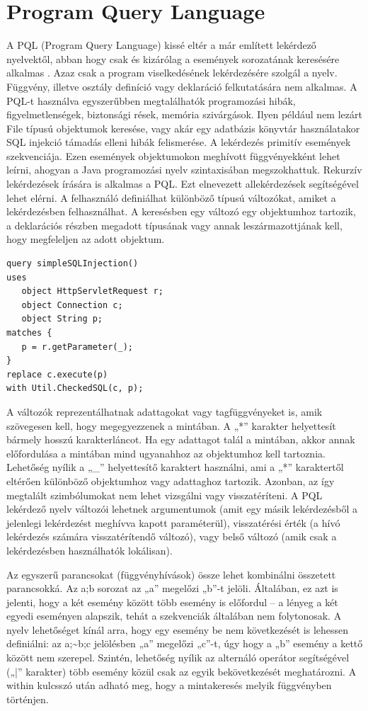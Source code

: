 \documentclass[a4paper,12pt]{report}
\begin{document}
\section{Program Query Language}
\par A PQL (Program Query Language) kissé eltér a már említett lekérdező nyelvektől, abban hogy csak és kizárólag a események sorozatának keresésére alkalmas \cite{pql}. Azaz csak a program viselkedésének lekérdezésére szolgál a nyelv. Függvény, illetve osztály definíció vagy deklaráció felkutatására nem alkalmas. A PQL-t használva egyszerűbben megtalálhatók programozási hibák, figyelmetlenségek, biztonsági rések, memória szivárgások. Ilyen például nem lezárt File típusú objektumok keresése, vagy akár egy adatbázis könyvtár használatakor SQL injekció támadás elleni hibák felismerése. A lekérdezés primitív események szekvenciája. Ezen események objektumokon meghívott függvényekként lehet leírni, ahogyan a Java programozási nyelv szintaxisában megszokhattuk. Rekurzív lekérdezések írására is alkalmas a PQL. Ezt elnevezett allekérdezések segítségével lehet elérni. A felhasználó definiálhat különböző típusú változókat, amiket a lekérdezésben felhasználhat. A keresésben egy változó egy objektumhoz tartozik, a deklarációs részben megadott típusának vagy annak leszármazottjának kell, hogy megfeleljen az adott objektum.
\begin{verbatim}
query simpleSQLInjection()
uses
   object HttpServletRequest r;
   object Connection c;
   object String p;
matches { 
   p = r.getParameter(_); 
}
replace c.execute(p)
with Util.CheckedSQL(c, p);
\end{verbatim} 
\par A változók reprezentálhatnak adattagokat vagy tagfüggvényeket is, amik szövegesen kell, hogy megegyezzenek a mintában. A „*” karakter helyettesít bármely hosszú karakterláncot. Ha egy adattagot talál a mintában, akkor annak előfordulása a mintában mind ugyanahhoz az objektumhoz kell tartoznia. Lehetőség nyílik a „\_” helyettesítő karaktert használni, ami a „*” karaktertől eltérően különböző objektumhoz vagy adattaghoz tartozik. Azonban, az így megtalált szimbólumokat nem lehet vizsgálni vagy visszatéríteni. A PQL lekérdező nyelv változói lehetnek argumentumok (amit egy másik lekérdezésből a jelenlegi lekérdezést meghívva kapott paraméterül), visszatérési érték (a hívó lekérdezés számára visszatérítendő változó), vagy belső változó (amik csak a lekérdezésben használhatók lokálisan).
\par Az egyszerű parancsokat (függvényhívások) össze lehet kombinálni összetett parancsokká. Az a;b sorozat az „a” megelőzi „b”-t jelöli. Általában, ez azt is jelenti, hogy a két esemény között több esemény is előfordul – a lényeg a két egyedi eseményen alapszik, tehát a szekvenciák általában nem folytonosak. A nyelv lehetőséget kínál arra, hogy egy esemény be nem következését is lehessen definiálni: az a;\textasciitilde b;c jelölésben „a” megelőzi „c”-t, úgy hogy a „b” esemény a kettő között nem szerepel. Szintén, lehetőség nyílik az alternáló operátor segítségével („|” karakter) több esemény közül csak az egyik bekövetkezését meghatározni. A within kulcsszó után adható meg, hogy a mintakeresés melyik függvényben történjen.
\end{document}
